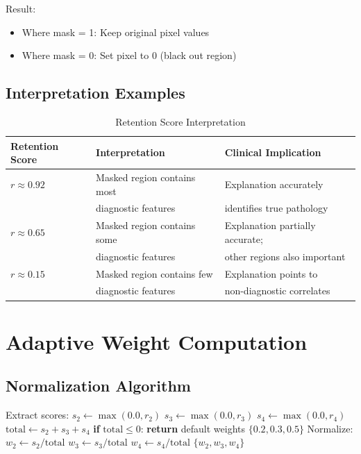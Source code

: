 \documentclass[12pt,a4paper,oneside]{book}
\begin{document}
Result:
\begin{itemize}
  \item Where mask = 1: Keep original pixel values
  \item Where mask = 0: Set pixel to 0 (black out region)
\end{itemize}

\subsection{Interpretation Examples}

\begin{table}[H]
\centering
\begin{tabular}{lll}
\toprule
\textbf{Retention Score} & \textbf{Interpretation} & \textbf{Clinical Implication} \\
\midrule
$r \approx 0.92$ & Masked region contains most & Explanation accurately \\
& diagnostic features & identifies true pathology \\
$r \approx 0.65$ & Masked region contains some & Explanation partially accurate; \\
& diagnostic features & other regions also important \\
$r \approx 0.15$ & Masked region contains few & Explanation points to \\
& diagnostic features & non-diagnostic correlates \\
\bottomrule
\end{tabular}
\caption{Retention Score Interpretation}
\label{tab:retention_interpretation}
\end{table}

\section{Adaptive Weight Computation}

\subsection{Normalization Algorithm}

\begin{algorithm}[H]
\caption{Compute Adaptive Fusion Weights}
\begin{algorithmic}[1]
  \State Extract scores:
  \State \quad $s_2 \gets \max(0.0, r_2)$
  \State \quad $s_3 \gets \max(0.0, r_3)$
  \State \quad $s_4 \gets \max(0.0, r_4)$
  \State
  \State $\text{total} \gets s_2 + s_3 + s_4$
  \State
  \State \textbf{if} $\text{total} \leq 0$:
  \State \quad \textbf{return} default weights $\{0.2, 0.3, 0.5\}$
  \State
  \State Normalize:
  \State \quad $w_2 \gets s_2 / \text{total}$
  \State \quad $w_3 \gets s_3 / \text{total}$
  \State \quad $w_4 \gets s_4 / \text{total}$
  \State
  \Return $\{w_2, w_3, w_4\}$
\EndProcedure
\end{algorithmic}
\end{algorithm}
\end{document}

